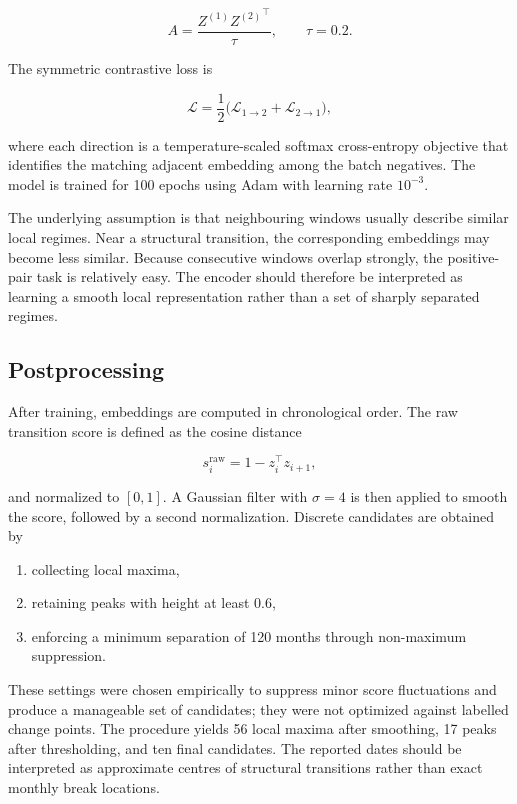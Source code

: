 \documentclass[
]{krantz}
\providecommand{\tightlist}{%
  \setlength{\itemsep}{0pt}\setlength{\parskip}{0pt}}
\begin{document}
\[
A=\frac{Z^{(1)}{Z^{(2)}}^\top}{\tau},
\qquad \tau=0.2.
\]

The symmetric contrastive loss is

\[
\mathcal{L}
=
\frac12
\bigl(
\mathcal{L}_{1\rightarrow2}
+
\mathcal{L}_{2\rightarrow1}
\bigr),
\]

where each direction is a temperature-scaled softmax cross-entropy objective that identifies the matching adjacent embedding among the batch negatives. The model is trained for 100 epochs using Adam with learning rate \(10^{-3}\).

The underlying assumption is that neighbouring windows usually describe similar local regimes. Near a structural transition, the corresponding embeddings may become less similar. Because consecutive windows overlap strongly, the positive-pair task is relatively easy. The encoder should therefore be interpreted as learning a smooth local representation rather than a set of sharply separated regimes.

\subsection{Postprocessing}\label{postprocessing}

After training, embeddings are computed in chronological order. The raw transition score is defined as the cosine distance

\[
s_i^{\mathrm{raw}}=1-z_i^\top z_{i+1},
\]

and normalized to \([0,1]\). A Gaussian filter with \(\sigma=4\) is then applied to smooth the score, followed by a second normalization. Discrete candidates are obtained by

\begin{enumerate}
\def\labelenumi{\arabic{enumi}.}
\tightlist
\item
  collecting local maxima,
\item
  retaining peaks with height at least \(0.6\),
\item
  enforcing a minimum separation of 120 months through non-maximum suppression.
\end{enumerate}

These settings were chosen empirically to suppress minor score fluctuations and produce a manageable set of candidates; they were not optimized against labelled change points. The procedure yields 56 local maxima after smoothing, 17 peaks after thresholding, and ten final candidates. The reported dates should be interpreted as approximate centres of structural transitions rather than exact monthly break locations.
\end{document}
